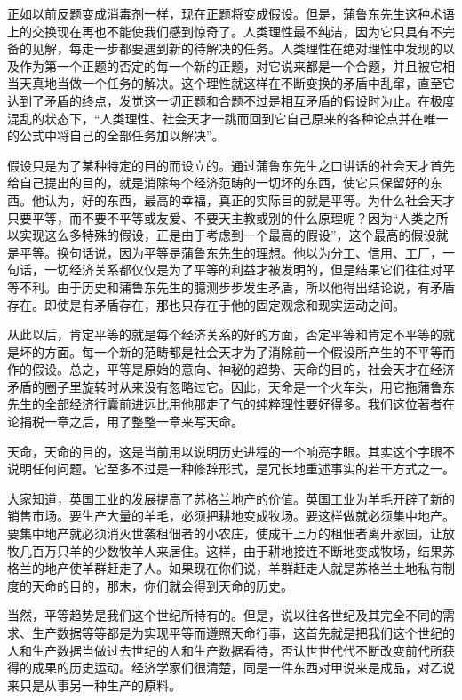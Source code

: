 \documentclass[a4paper,twoside,12pt,AutoFakeBold]{ctexart}
\begin{document}
正如以前反题变成消毒剂一样，现在正题将变成假设。但是，蒲鲁东先生这种术语上的交换现在再也不能使我们感到惊奇了。人类理性最不纯洁，因为它只具有不完备的见解，每走一步都要遇到新的待解决的任务。人类理性在绝对理性中发现的以及作为第一个正题的否定的每一个新的正题，对它说来都是一个合题，并且被它相当天真地当做一个任务的解决。这个理性就这样在不断变换的矛盾中乱窜，直至它达到了矛盾的终点，发觉这一切正题和合题不过是相互矛盾的假设时为止。在极度混乱的状态下，“人类理性、社会天才一跳而回到它自己原来的各种论点并在唯一的公式中将自己的全部任务加以解决”。

假设只是为了某种特定的目的而设立的。通过蒲鲁东先生之口讲话的社会天才首先给自己提出的目的，就是消除每个经济范畴的一切坏的东西，使它只保留好的东西。他认为，好的东西，最高的幸福，真正的实际目的就是平等。为什么社会天才只要平等，而不要不平等或友爱、不要天主教或别的什么原理呢？因为“人类之所以实现这么多特殊的假设，正是由于考虑到一个最高的假设”，这个最高的假设就是平等。换句话说，因为平等是蒲鲁东先生的理想。他以为分工、信用、工厂，一句话，一切经济关系都仅仅是为了平等的利益才被发明的，但是结果它们往往对平等不利。由于历史和蒲鲁东先生的臆测步步发生矛盾，所以他得出结论说，有矛盾存在。即使是有矛盾存在，那也只存在于他的固定观念和现实运动之间。

从此以后，肯定平等的就是每个经济关系的好的方面，否定平等和肯定不平等的就是坏的方面。每一个新的范畴都是社会天才为了消除前一个假设所产生的不平等而作的假设。总之，平等是原始的意向、神秘的趋势、天命的目的，社会天才在经济矛盾的圈子里旋转时从来没有忽略过它。因此，天命是一个火车头，用它拖蒲鲁东先生的全部经济行囊前进远比用他那走了气的纯粹理性要好得多。我们这位著者在论捐税一章之后，用了整整一章来写天命。

天命，天命的目的，这是当前用以说明历史进程的一个响亮字眼。其实这个字眼不说明任何问题。它至多不过是一种修辞形式，是冗长地重述事实的若干方式之一。

大家知道，英国工业的发展提高了苏格兰地产的价值。英国工业为羊毛开辟了新的销售市场。要生产大量的羊毛，必须把耕地变成牧场。要这样做就必须集中地产。要集中地产就必须消灭世袭租佃者的小农庄，使成千上万的租佃者离开家园，让放牧几百万只羊的少数牧羊人来居住。这样，由于耕地接连不断地变成牧场，结果苏格兰的地产使羊群赶走了人。如果现在你们说，羊群赶走人就是苏格兰土地私有制度的天命的目的，那末，你们就会得到天命的历史。

当然，平等趋势是我们这个世纪所特有的。但是，说以往各世纪及其完全不同的需求、生产数据等等都是为实现平等而遵照天命行事，这首先就是把我们这个世纪的人和生产数据当做过去世纪的人和生产数据看待，否认世世代代不断改变前代所获得的成果的历史运动。经济学家们很清楚，同是一件东西对甲说来是成品，对乙说来只是从事另一种生产的原料。
\end{document}
